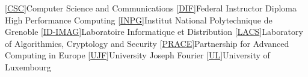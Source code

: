 \documentclass{cv}
\begin{document}

\ifShortOrFull{
  \vspace*{-1em}
  
}



\unlesstinycv{
  \ifShortOrFull{
    
  }

  \iffullcv{
    
  }
  \ifshortcv{\clearpage}

  

  


  

  \ifShortOrFull{
    \iffullcv{\clearpage}
    
  }

}




\begin{acronym}
  [\href{http://csc.uni.lu}{CSC}]{Computer Science and Communications}
  [\href{http://www.ffkama.fr/direction-technique/formation/formationsfederales.php}{DIF}]{Federal Instructor Diploma}
   {High Performance Computing}
  [\href{http://www.grenoble-inp.fr/}{INPG}]{Institut National Polytechnique de Grenoble}
  [\href{http://www-id.imag.fr}{ID-IMAG}]{Laboratoire Informatique et Distribution}
  [\href{http://lacs.uni.lu}{LACS}]{Laboratory of Algorithmics, Cryptology and Security}
  [\href{http://www.prace-ri.eu/}{PRACE}]{Partnership for Advanced Computing in Europe}
  [\href{http://www.ujf-grenoble.fr/}{UJF}]{University Joseph Fourier}
  [\href{http://www.uni.lu}{UL}]{University of Luxembourg}
\end{acronym}
\end{document}
